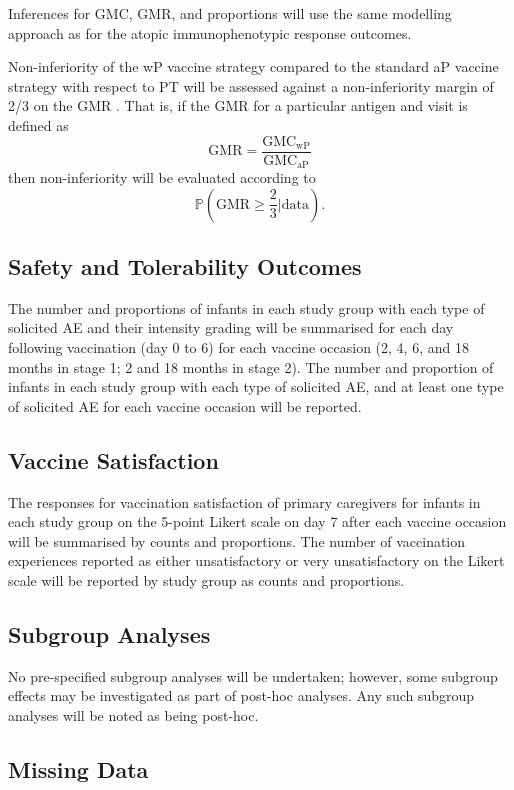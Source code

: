 \documentclass{bmcart}
\begin{document}
Inferences for GMC, GMR, and proportions will use the same modelling approach as for the atopic immunophenotypic response outcomes.

Non-inferiority of the wP vaccine strategy compared to the standard aP vaccine strategy with respect to PT will be assessed against a non-inferiority margin of 2/3 on the GMR \cite{who}.
That is, if the GMR for a particular antigen and visit is defined as
$$
\text{GMR} = \frac{\text{GMC}_\text{wP}}{\text{GMC}_\text{aP}}
$$ 
then non-inferiority will be evaluated according to
$$
\mathbb P\left(\text{GMR}\geq \frac{2}{3}\Big\vert \text{data}\right).
$$

\subsection*{Safety and Tolerability Outcomes}

The number and proportions of infants in each study group with each type of solicited AE and their intensity grading will be summarised for each day following vaccination (day 0 to 6) for each vaccine occasion (2, 4, 6, and 18 months in stage 1; 2 and 18 months in stage 2).
The number and proportion of infants in each study group with each type of solicited AE, and at least one type of solicited AE for each vaccine occasion will be reported.

\subsection*{Vaccine Satisfaction}

The responses for vaccination satisfaction of primary caregivers for infants in each study group on the 5-point Likert scale on day 7 after each vaccine occasion will be summarised by counts and proportions.
The number of vaccination experiences reported as either unsatisfactory or very unsatisfactory on the Likert scale will be reported by study group as counts and proportions.

\subsection*{Subgroup Analyses}

No pre-specified subgroup analyses will be undertaken; however, some subgroup effects may be investigated as part of post-hoc analyses.
Any such subgroup analyses will be noted as being post-hoc.


\subsection*{Missing Data}
\end{document}
